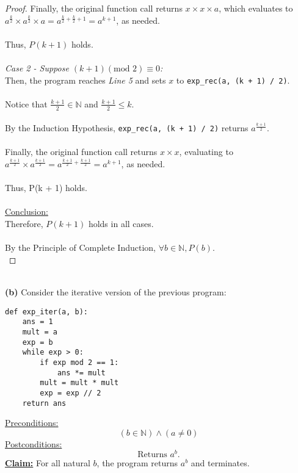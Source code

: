 \documentclass[12pt]{article}
\begin{document}
\begin{proof}
    Finally, the original function call returns $x \times x \times a$, which evaluates to $a^{\frac{k}{2}} \times a^{\frac{k}{2}} \times a = a^{\frac{k}{2} + \frac{k}{2} + 1} = a^{k + 1}$, as needed. \\
    \\
    Thus, $P(k + 1)$ holds. \\
    \\
    \textit{Case 2 - Suppose $(k + 1) (\text{mod } 2) \equiv 0$:} \\
    Then, the program reaches \textit{Line 5} and sets $x$ to \verb|exp_rec(a, (k + 1) / 2)|. \\
    \\
    Notice that $\frac{k + 1}{2} \in \mathbb{N}$ and $\frac{k + 1}{2} \leq k$. \\
    \\
    By the Induction Hypothesis, \verb|exp_rec(a, (k + 1) / 2)| returns $a^{\frac{k + 1}{2}}$. \\
    \\
    Finally, the original function call returns $x \times x$, evaluating to $a^{\frac{k + 1}{2}} \times a^{\frac{k + 1}{2}} = a^{\frac{k + 1}{2} + \frac{k + 1}{2}} = a^{k + 1}$, as needed. \\
    \\
    Thus, P(k + 1) holds. \\
    \\
    \underline{Conclusion:} \\
    Therefore, $P(k + 1)$ holds in all cases. \\
    \\
    By the Principle of Complete Induction, $\forall b \in \mathbb{N}, P(b)$. \\
\end{proof}
\leavevmode\\
\textbf{(b)} Consider the iterative version of the previous program:
\begin{lstlisting}
def exp_iter(a, b):
    ans = 1
    mult = a
    exp = b
    while exp > 0:
        if exp mod 2 == 1:
            ans *= mult
        mult = mult * mult
        exp = exp // 2
    return ans
\end{lstlisting}
\underline{Preconditions:}
\[
    (b \in \mathbb{N}) \land (a \neq 0)
\]
\underline{Postconditions:}
\[
    \text{Returns } a^b \text{.}
\]
\textbf{\underline{Claim:}} For all natural $b$, the program returns $a^b$ and terminates.
\end{document}
